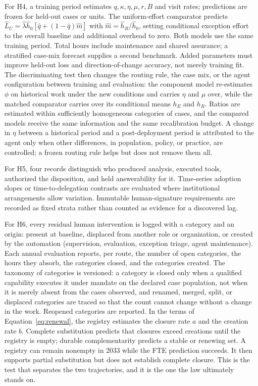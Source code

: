 For H4, a training period estimates $q,\kappa,\eta,\mu,r,B$ and visit rates; predictions are frozen
for held-out cases or units. The uniform-effort comparator predicts
$\hat L_U=\hat\lambda\hat h_0[\hat q+(1-\hat q)\hat m]$ with $\hat m=\hat h_R/\hat h_0$, setting
conditional exception effort to the overall baseline and additional overhead to zero. Both models use
the same training period. Total hours include maintenance and shared assurance; a stratified case-mix
forecast supplies a second benchmark. Added parameters must improve held-out loss and
direction-of-change accuracy, not merely training fit. The discriminating test then changes the routing
rule, the case mix, or the agent configuration between training and evaluation: the component model
re-estimates $\phi$ on historical work under the new conditions and carries $\eta$ and $\mu$ over, while
the matched comparator carries over its conditional means $h_E$ and $h_R$. Ratios are estimated within
sufficiently homogeneous categories of cases, and the compared models receive the same information and
the same recalibration budget. A change in $\eta$ between a
historical period and a post-deployment period is attributed to the agent only when other differences,
in population, policy, or practice, are controlled; a frozen routing rule helps but does not remove them
all.

For H5, four records distinguish who produced analysis, executed tools, authorized the disposition,
and held answerability for it. Time-series adoption slopes or time-to-delegation contrasts are
evaluated where institutional arrangements allow variation. Immutable human-signature requirements are
recorded as fixed strata rather than counted as evidence for a discovered lag.

For H6, every residual human intervention is logged with a category and an origin: present at baseline,
displaced from another role or organization, or created by the automation (supervision, evaluation,
exception triage, agent maintenance). Each annual evaluation reports, per route, the number of open
categories, the hours they absorb, the categories closed, and the categories created. The taxonomy of categories is versioned: a category is closed only when a qualified capability executes
it under mandate on the declared case population, not when it is merely absent from the cases observed,
and renamed, merged, split, or displaced categories are traced so that the count cannot change without
a change in the work. Reopened categories are reported. In the terms of
Equation~\eqref{eq:renewal}, the registry estimates the closure rate $a$ and the creation rate $b$.
Complete substitution predicts that closures exceed creations until the registry is empty; durable
complementarity predicts a stable or renewing set. A registry can remain nonempty in 2033 while the FTE prediction succeeds.
It then supports partial substitution but does not establish complete closure. This is the test that separates the two
trajectories, and it is the one the law ultimately stands on.

